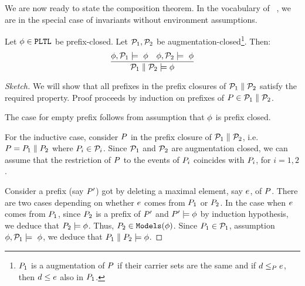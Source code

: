 We are now ready to state the composition theorem.  In the vocabulary of
~\citet{Abadi:1993:CS:151646.151649}, we are in the special case of
invariants without environment assumptions.
\begin{lemma}[Composition]
  Let $\phi \in {\tt PLTL}$ be prefix-closed.  Let $\mathcal{P}_1, \mathcal{P}_2$ be
  augmentation-closed\footnote{$P_1$ is a augmentation of $P$ if their
    carrier sets are the same and if $ d \le_{P} e$, then
    $d \le e$ also in $P_1$.}.  Then:
  \begin{displaymath}
    \frac{
      \phi, \mathcal{P}_1 \models\ \phi
      \quad
      \phi, \mathcal{P}_2 \models\ \phi
    }{\mathcal{P}_1 \parallel \mathcal{P}_2 \models \phi}
  \end{displaymath}
\end{lemma}
\begin{proof}[Sketch]
  We will show that all prefixes in the prefix closures of
  $\mathcal{P}_1 \parallel \mathcal{P}_2$ satisfy the required property.  Proof proceeds
  by induction on prefixes of $P \in \mathcal{P}_1 \parallel \mathcal{P}_2$.

  The case for empty prefix  follows from assumption that  $\phi$ is prefix closed.  

  For the inductive case, consider $P$ in the prefix closure of
  $\mathcal{P}_1 \parallel \mathcal{P}_2$, i.e. $P = P_1 \parallel P_2$ where
  $P_i \in \mathcal{P}_i$.  Since $\mathcal{P}_1$ and $\mathcal{P}_2$ are augmentation
  closed, we can assume that the restriction of $P$ to the events of
  $P_i$ coincides with $P_i$, for $i=1,2$.

  Consider a prefix (say $P'$) got by deleting a maximal element, say
  $e$, of $P$.  There are two cases depending on whether $e$ comes
  from $P_1$ or $P_2$.  In the case when $e$ comes from $P_1$,
  since $P_2$ is a prefix of $P'$ and $P' \models \phi$ by induction
  hypothesis, we deduce that $P_2 \models \phi$.  Thus,
  $P_2 \in \tt Models{(\phi)}$.  Since $P_1 \in \mathcal{P}_1$, assumption
  $\phi, \mathcal{P}_1 \models\ \phi$, we deduce that
  $P_1 \parallel P_2 \models \phi$.
\end{proof}

\endinput

